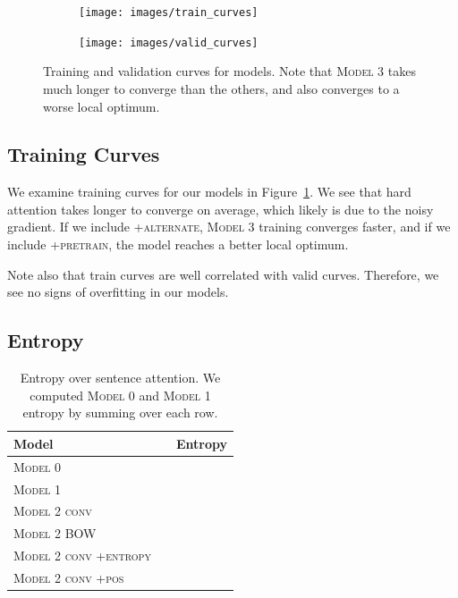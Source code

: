 \documentclass[12pt]{report}
\begin{document}
\begin{figure}[t]
\centering
\begin{subfigure}{0.45\textwidth}
\texttt{[image: images/train\_curves]}
\end{subfigure}
\begin{subfigure}{0.45\textwidth}
\texttt{[image: images/valid\_curves]}
\end{subfigure}

\caption{Training and validation curves for models. Note that \textsc{Model 3} takes much longer to converge than the others, and also converges to a worse local optimum.} %
\label{fig:train_curves}
\end{figure}


\subsection{Training Curves} We examine training curves for our models in Figure~\ref{fig:train_curves}. We see that hard attention takes longer to converge on average, which likely is due to the noisy gradient.
If we include \textsc{+alternate}, \textsc{Model 3} training converges faster, and if we include \textsc{+pretrain}, the model reaches a better local optimum.

Note also that train curves are well correlated with valid curves. Therefore, we see no signs of overfitting in our models.


\subsection{Entropy}

\begin{table}[t]
\centering
\begin{tabular}{llr}
\toprule
Model & & Entropy \\
\midrule
\textsc{Model 0} & & \\
\textsc{Model 1} & & \\
\textsc{Model 2 conv} & & \\
\textsc{Model 2 BOW} & & \\
\textsc{Model 2 conv +entropy} & &  \\
\textsc{Model 2 conv +pos} & & \\
\bottomrule
\end{tabular}
\caption{Entropy over sentence attention. We computed \textsc{Model 0} and \textsc{Model 1} entropy by summing over each row.}
\label{table:entropy}
\end{table}
\end{document}
